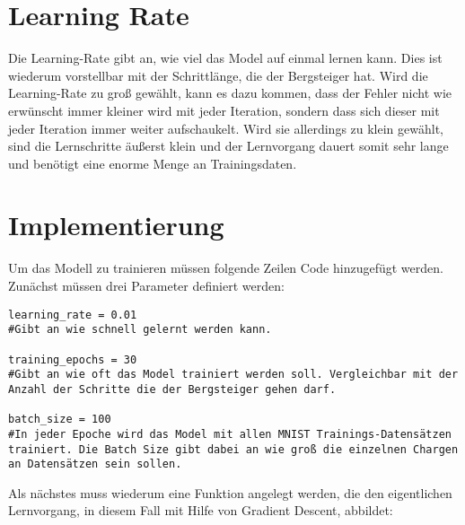 \section{Learning Rate}
Die Learning-Rate gibt an, wie viel das Model auf einmal lernen kann. Dies ist wiederum vorstellbar mit der Schrittlänge, die der Bergsteiger hat. Wird die Learning-Rate zu groß gewählt, kann es dazu kommen, dass der Fehler nicht wie erwünscht immer kleiner wird mit jeder Iteration, sondern dass sich dieser mit jeder Iteration immer weiter aufschaukelt.
Wird sie allerdings zu klein gewählt, sind die Lernschritte äußerst klein und der Lernvorgang dauert somit sehr lange und benötigt eine enorme Menge an Trainingsdaten.

\section{Implementierung}

Um das Modell zu trainieren müssen folgende Zeilen Code hinzugefügt werden. Zunächst müssen drei Parameter definiert werden:

\lstset{language=Python}

\begin{lstlisting}
learning_rate = 0.01 
#Gibt an wie schnell gelernt werden kann.

training_epochs = 30
#Gibt an wie oft das Model trainiert werden soll. Vergleichbar mit der Anzahl der Schritte die der Bergsteiger gehen darf.

batch_size = 100
#In jeder Epoche wird das Model mit allen MNIST Trainings-Datensätzen trainiert. Die Batch Size gibt dabei an wie groß die einzelnen Chargen an Datensätzen sein sollen.

\end{lstlisting}

Als nächstes muss wiederum eine Funktion angelegt werden, die den eigentlichen Lernvorgang, in diesem Fall mit Hilfe von Gradient Descent, abbildet:

\lstset{language=Python}

